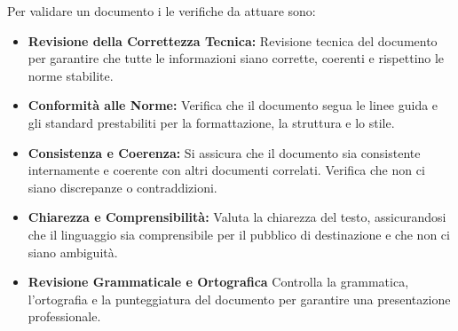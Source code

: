 \documentclass{article}
\begin{document}
Per validare un documento i le verifiche da attuare sono:
\begin{itemize}
    \item \textbf{Revisione della Correttezza Tecnica:} Revisione tecnica del documento per garantire che tutte le informazioni siano corrette, coerenti e rispettino le norme stabilite.
     \item \textbf{Conformità alle Norme:} Verifica che il documento segua le linee guida e gli standard prestabiliti per la formattazione, la struttura e lo stile.
      \item \textbf{Consistenza e Coerenza:} Si assicura che il documento sia consistente internamente e coerente con altri documenti correlati. Verifica che non ci siano discrepanze o contraddizioni.
      \item \textbf{Chiarezza e Comprensibilità:} Valuta la chiarezza del testo, assicurandosi che il linguaggio sia comprensibile per il pubblico di destinazione e che non ci siano ambiguità.
      \item \textbf{Revisione Grammaticale e Ortografica} Controlla la grammatica, l'ortografia e la punteggiatura del documento per garantire una presentazione professionale.
\end{itemize}
\end{document}
